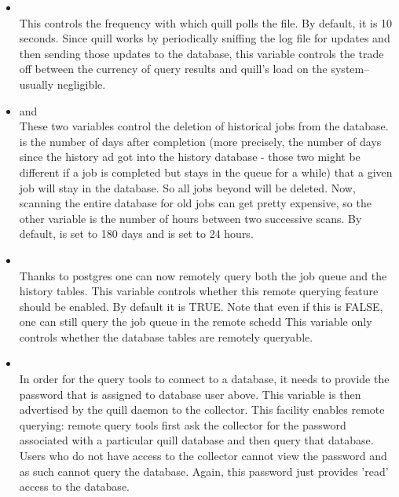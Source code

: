 \begin{enumerate}
\begin{itemize}
\item {}\\
This controls the frequency with which quill polls the
 file.  By default, it is 10 seconds.  Since quill
works by periodically sniffing the log file for updates and then sending
those updates to the database, this variable controls the trade off between
the currency of query results and quill's load on the system--usually
negligible.

\item {} and 
		\\
These two variables control the deletion of historical jobs from the
database.   is the number of days
after completion (more precisely, the number of days since the history ad got 
into the history database - those two might be different if a job is completed 
but stays in the queue for a while) that a given job will stay in the database.  
So all jobs beyond  will be deleted.  Now,
scanning the entire database for old jobs can get pretty expensive,
so the other variable 
is the number of hours between two successive scans.  By default,
 is set to 180 days and
 is set to 24 hours.

\item {}\\
Thanks to postgres one can now remotely query both the job queue and the
history tables. This variable controls whether this remote querying 
feature should be enabled.  By default it is TRUE.  Note that even if 
this is FALSE, one can still query the job queue in the remote schedd
This variable only controls whether the database tables are remotely queryable.

\item {}\\
In order for the query tools to connect to a database, it needs to provide
the password that is assigned to database user  above. 
This variable is then advertised by the quill daemon to the collector.  
This facility enables remote querying: remote  query tools first 
ask the collector for the password associated with a particular quill database 
and then query that database.  Users who do not have access to the collector 
cannot view the password and as such cannot query the database.  Again, this 
password just provides 'read' access to the database.


\end{itemize}
\end{enumerate}
